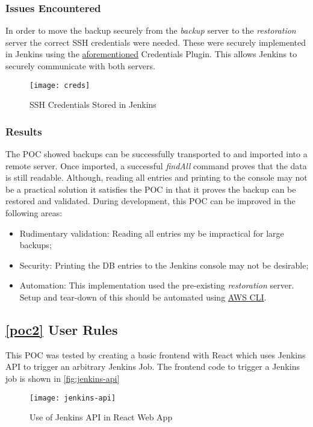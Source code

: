 	\subsubsection{Issues Encountered}
	In order to move the backup securely from the \textit{backup} server to the \textit{restoration} server the correct SSH credentials were needed. These were securely implemented in Jenkins using the \hyperref[creds-plugin]{aforementioned} Credentials Plugin. This allows Jenkins to securely communicate with both servers.
	
	\begin{figure}[H]
		\caption{SSH Credentials Stored in Jenkins}
		\centering
		\texttt{[image: creds]}
		\label{fig:creds}
	\end{figure}

	\subsubsection{Results}
	The POC showed backups can be successfully transported to and imported into a remote server. Once imported, a successful \textit{findAll} command proves that the data is still readable. Although, reading all entries and printing to the console may not be a practical solution it satisfies the POC in that it proves the backup can be restored and validated. During development, this POC can be improved in the following areas:
	\begin{itemize}
		\item Rudimentary validation: Reading all entries my be impractical for large backups;
		\item Security: Printing the DB entries to the Jenkins console may not be desirable;
		\item Automation: This implementation used the pre-existing \textit{restoration} server. Setup and tear-down of this should be automated using \hyperref[aws-cli]{AWS CLI}.
	\end{itemize}
		
	\subsection{\ref{poc2} User Rules}
	This POC was tested by creating a basic frontend with React which uses Jenkins API to trigger an arbitrary Jenkins Job. The frontend code to trigger a Jenkins job is shown in \autoref{fig:jenkins-api}
	
	\begin{figure}[H]
		\caption{Use of Jenkins API in React Web App}
		\centering
		\texttt{[image: jenkins-api]}
		\label{fig:jenkins-api}
	\end{figure}
	
